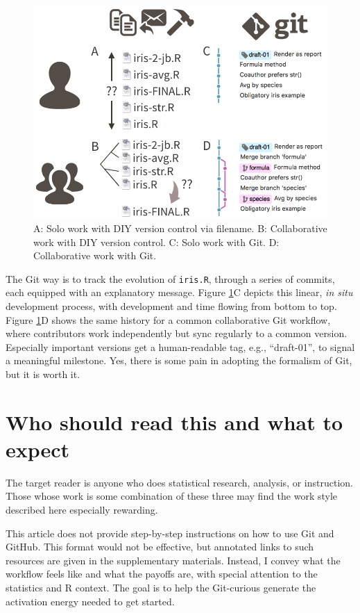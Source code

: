 \documentclass[12pt]{article}
\begin{document}
\begin{figure}
\includegraphics[width=1\linewidth]{diy-vs-git-solo-vs-collab} \caption{\label{fig:diy-vs-git}A: Solo work with DIY version control via filename. B: Collaborative work with DIY version control. C: Solo work with Git. D: Collaborative work with Git.}\label{fig:diy-vs-git}
\end{figure}

The Git way is to track the evolution of \texttt{iris.R}, through a
series of commits, each equipped with an explanatory message. Figure
\ref{fig:diy-vs-git}C depicts this linear, \emph{in situ} development
process, with development and time flowing from bottom to top. Figure
\ref{fig:diy-vs-git}D shows the same history for a common collaborative
Git workflow, where contributors work independently but sync regularly
to a common version. Especially important versions get a human-readable
tag, e.g., ``draft-01'', to signal a meaningful milestone. Yes, there is
some pain in adopting the formalism of Git, but it is worth it.

\section{Who should read this and what to
expect}\label{who-should-read-this-and-what-to-expect}

The target reader is anyone who does statistical research, analysis, or
instruction. Those whose work is some combination of these three may
find the work style described here especially rewarding.

This article does not provide step-by-step instructions on how to use
Git and GitHub. This format would not be effective, but annotated links
to such resources are given in the supplementary materials. Instead, I
convey what the workflow feels like and what the payoffs are, with
special attention to the statistics and R context. The goal is to help
the Git-curious generate the activation energy needed to get started.
\end{document}
